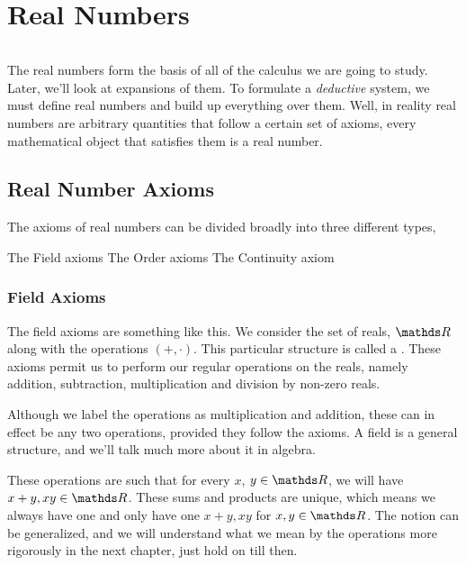 \chapter{Real Numbers}


\begin{equation*}
\end{equation*}

The real numbers form the basis of all of the calculus we are going to study. Later, we'll look at expansions of them.
To formulate a \emph{deductive} system, we must define real numbers and build up everything over them. Well, in reality
real numbers are arbitrary quantities that follow a certain set of axioms, every mathematical object that satisfies
them is a real number.

\section{Real Number Axioms}

The axioms of real numbers can be divided broadly into three different types,

\begin{itemize}
    \ii The Field axioms
    \ii The Order axioms
    \ii The Continuity axiom
\end{itemize}

\subsection{Field Axioms}

The field axioms are something like this. We consider the set of reals, \(\RR\)
along with the operations \((+, \cdot)\). This particular structure is called a 
. These axioms permit us to perform our regular operations on 
the reals, namely addition, subtraction, multiplication and division by non-zero
reals.

Although we label the operations as multiplication and addition, these can in effect be 
any two operations, provided they follow the axioms. A field is a general structure, 
and we'll talk much more about it in algebra.

These operations are such that for every \(x\), \(y \in \RR\), we will have \(x + y, xy \in \RR\). 
These sums and products are unique, which means we always have one and only have one 
\(x+y, xy\) for \(x, y \in \RR\). The notion can be generalized, and we will understand what we mean by 
the operations more rigorously in the next chapter, just hold on till then.

